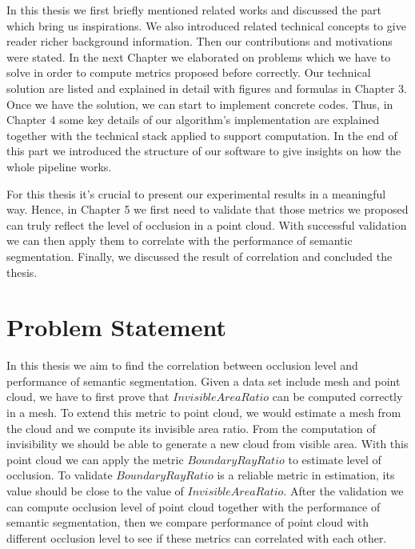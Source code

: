 \documentclass[11pt, a4paper,oneside,chapterprefix=false]{scrbook}
\begin{document}
In this thesis we first briefly mentioned related works and discussed the part which bring us inspirations. We also introduced related technical concepts to give reader richer background information. Then our contributions and motivations were stated. In the next Chapter we elaborated on problems which we have to solve in order to compute metrics proposed before correctly. Our technical solution are listed and explained in detail with figures and formulas in Chapter 3. Once we have the solution, we can start to implement concrete codes. Thus, in Chapter 4 some key details of our algorithm's implementation are explained together with the technical stack applied to support computation. In the end of this part we introduced the structure of our software to give insights on how the whole pipeline works.

\vspace{10pt}

For this thesis it's crucial to present our experimental results in a meaningful way. Hence, in Chapter 5 we first need to validate that those metrics we proposed can truly reflect the level of occlusion in a point cloud. With successful validation we can then apply them to correlate with the performance of semantic segmentation. Finally, we discussed the result of correlation and concluded the thesis.


\chapter{Problem Statement} \label{chp:problem}

In this thesis we aim to find the correlation between occlusion level and performance of semantic segmentation. Given a data set include mesh and point cloud, we have to first prove that ${InvisibleAreaRatio}$ can be computed correctly in a mesh. To extend this metric to point cloud, we would estimate a mesh from the cloud and we compute its invisible area ratio. From the computation of invisibility we should be able to generate a new cloud from visible area. With this point cloud we can apply the metric ${BoundaryRayRatio}$ to estimate level of occlusion. To validate ${BoundaryRayRatio}$ is a reliable metric in estimation, its value should be close to the value of ${InvisibleAreaRatio}$. After the validation we can compute occlusion level of point cloud together with the performance of semantic segmentation, then we compare performance of point cloud with different occlusion level to see if these metrics can correlated with each other.
\end{document}
